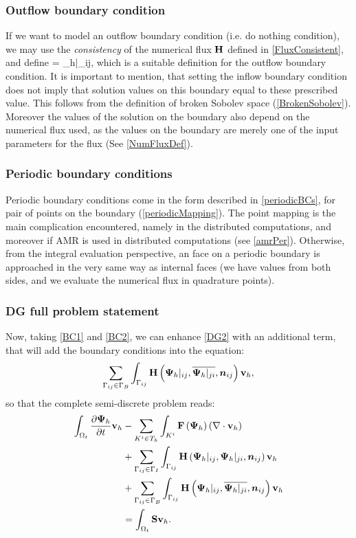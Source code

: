 \subsubsection{Outflow boundary condition}
If we want to model an outflow boundary condition (i.e. do nothing condition), we may use the \textit{consistency} of the numerical flux $\mathrm{\mathbf{H}}$ defined in \cref{FluxConsistent}, and define
\be
\label{BC2}  = {\mrPsi_h}|_{ij},
\ee
which is a suitable definition for the outflow boundary condition. It is important to mention, that setting the inflow boundary condition does not imply that solution values on this boundary equal to these prescribed value. This follows from the definition of broken Sobolev space (\cref{BrokenSobolev}). Moreover the values of the solution on the boundary also depend on the numerical flux used, as the values on the boundary are merely one of the input parameters for the flux (See \cref{NumFluxDef}).

\subsubsection{Periodic boundary conditions}
\label{sec:periodicDg}
Periodic boundary conditions come in the form described in \cref{periodicBCs}, for pair of points on the boundary (\cref{periodicMapping}). The point mapping is the main complication encountered, namely in the distributed computations, and moreover if AMR is used in distributed computations (see \cref{amrPer}). Otherwise, from the integral evaluation perspective, an face on a periodic boundary is approached in the very same way as internal faces (we have values from both sides, and we evaluate the numerical flux in quadrature points).

\subsubsection{DG full problem statement}
Now, taking \cref{BC1} and \cref{BC2}, we can enhance \cref{DG2} with an additional term, that will add the boundary conditions into the equation:
$$
\sum_{\Gamma_{ij}\in\Gamma_B} \int_{\Gamma_{ij}} \mathrm{\mathbf{H}}\left({\mathrm{\mathbf{\Psi}}_h}|_{ij}, \overline{{\mathrm{\mathbf{\Psi}}_h}|_{ji}}, \mbox{\boldmath $n$}_{ij}\right) \mathrm{\mathbf{v}}_h,
$$
so that the complete semi-discrete problem reads:
\begin{align}
\label{DG3} \int_{\Omega_{t}} \frac{\partial{{\mathrm{\mathbf{\Psi}}_h}}}{\partial{t}} \mathrm{\mathbf{v}}_h & -  \sum_{K^i \in T_h}\int_{K^i}\mathrm{\mathbf{F}}\left({\mathrm{\mathbf{\Psi}}_h}\right) \left(\nabla \cdot \mathrm{\mathbf{v}}_h\right)\\ \nonumber & + \sum_{\Gamma_{ij}\in\Gamma_I} \int_{\Gamma_{ij}} \mathrm{\mathbf{H}}\left({\mathrm{\mathbf{\Psi}}_h}|_{ij}, {\mathrm{\mathbf{\Psi}}_h}|_{ji}, \mbox{\boldmath $n$}_{ij}\right) \mathrm{\mathbf{v}}_h\\
\nonumber & + \sum_{\Gamma_{ij}\in\Gamma_B} \int_{\Gamma_{ij}} \mathrm{\mathbf{H}}\left({\mathrm{\mathbf{\Psi}}_h}|_{ij}, \overline{{\mathrm{\mathbf{\Psi}}_h}|_{ji}}, \mbox{\boldmath $n$}_{ij}\right) \mathrm{\mathbf{v}}_h\\
\nonumber & = \int_{\Omega_{t}} \mathrm{\mathbf{S}} \mathrm{\mathbf{v}}_h.
\end{align}

